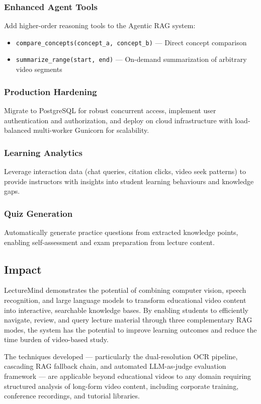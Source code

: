 \subsubsection{Enhanced Agent Tools}

Add higher-order reasoning tools to the Agentic RAG system:
\begin{itemize}
    \item \texttt{compare\_concepts(concept\_a, concept\_b)} --- Direct concept comparison
    \item \texttt{summarize\_range(start, end)} --- On-demand summarization of arbitrary video segments
\end{itemize}

\subsubsection{Production Hardening}

Migrate to PostgreSQL for robust concurrent access, implement user authentication and authorization, and deploy on cloud infrastructure with load-balanced multi-worker Gunicorn for scalability.

\subsubsection{Learning Analytics}

Leverage interaction data (chat queries, citation clicks, video seek patterns) to provide instructors with insights into student learning behaviours and knowledge gaps.

\subsubsection{Quiz Generation}

Automatically generate practice questions from extracted knowledge points, enabling self-assessment and exam preparation from lecture content.

\subsection{Impact}

LectureMind demonstrates the potential of combining computer vision, speech recognition, and large language models to transform educational video content into interactive, searchable knowledge bases. By enabling students to efficiently navigate, review, and query lecture material through three complementary RAG modes, the system has the potential to improve learning outcomes and reduce the time burden of video-based study.

The techniques developed --- particularly the dual-resolution OCR pipeline, cascading RAG fallback chain, and automated LLM-as-judge evaluation framework --- are applicable beyond educational videos to any domain requiring structured analysis of long-form video content, including corporate training, conference recordings, and tutorial libraries.
